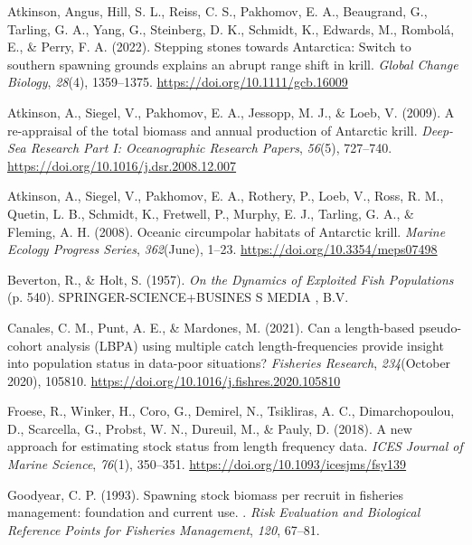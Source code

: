 \documentclass[
]{article}
\newlength{\cslhangindent}
\newlength{\cslentryspacingunit} %
\newenvironment{CSLReferences}[2] %
 {%
  \setlength{\parindent}{0pt}
  \ifodd #1
  \let\oldpar\par
  \def\par{\hangindent=\cslhangindent\oldpar}
  \fi
  \setlength{\parskip}{#2\cslentryspacingunit}
 }%
 {}
\begin{document}
\hypertarget{refs}{}
\begin{CSLReferences}{1}{0}
\leavevmode{}%
Atkinson, Angus, Hill, S. L., Reiss, C. S., Pakhomov, E. A., Beaugrand,
G., Tarling, G. A., Yang, G., Steinberg, D. K., Schmidt, K., Edwards,
M., Rombolá, E., \& Perry, F. A. (2022). {Stepping stones towards
Antarctica: Switch to southern spawning grounds explains an abrupt range
shift in krill}. \emph{Global Change Biology}, \emph{28}(4), 1359--1375.
\url{https://doi.org/10.1111/gcb.16009}

\leavevmode{}%
Atkinson, A., Siegel, V., Pakhomov, E. A., Jessopp, M. J., \& Loeb, V.
(2009). {A re-appraisal of the total biomass and annual production of
Antarctic krill}. \emph{Deep-Sea Research Part I: Oceanographic Research
Papers}, \emph{56}(5), 727--740.
\url{https://doi.org/10.1016/j.dsr.2008.12.007}

\leavevmode{}%
Atkinson, A., Siegel, V., Pakhomov, E. A., Rothery, P., Loeb, V., Ross,
R. M., Quetin, L. B., Schmidt, K., Fretwell, P., Murphy, E. J., Tarling,
G. A., \& Fleming, A. H. (2008). {Oceanic circumpolar habitats of
Antarctic krill}. \emph{Marine Ecology Progress Series},
\emph{362}(June), 1--23. \url{https://doi.org/10.3354/meps07498}

\leavevmode{}%
Beverton, R., \& Holt, S. (1957). \emph{{On the Dynamics of Exploited
Fish Populations}} (p. 540). SPRINGER-SCIENCE+BUSINES S MEDIA , B.V.

\leavevmode{}%
Canales, C. M., Punt, A. E., \& Mardones, M. (2021). {Can a length-based
pseudo-cohort analysis (LBPA) using multiple catch length-frequencies
provide insight into population status in data-poor situations?}
\emph{Fisheries Research}, \emph{234}(October 2020), 105810.
\url{https://doi.org/10.1016/j.fishres.2020.105810}

\leavevmode{}%
Froese, R., Winker, H., Coro, G., Demirel, N., Tsikliras, A. C.,
Dimarchopoulou, D., Scarcella, G., Probst, W. N., Dureuil, M., \& Pauly,
D. (2018). {A new approach for estimating stock status from length
frequency data}. \emph{ICES Journal of Marine Science}, \emph{76}(1),
350--351. \url{https://doi.org/10.1093/icesjms/fsy139}

\leavevmode{}%
Goodyear, C. P. (1993). {Spawning stock biomass per recruit in fisheries
management: foundation and current use. }. \emph{Risk Evaluation and
Biological Reference Points for Fisheries Management}, \emph{120},
67--81.


\end{CSLReferences}
\end{document}
